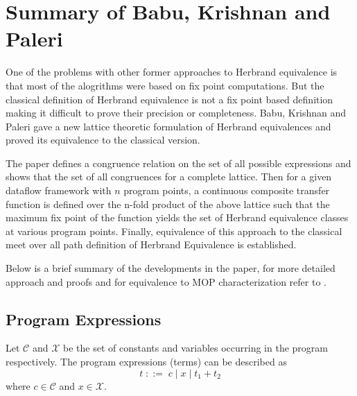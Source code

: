 \chapter{Summary of Babu, Krishnan and Paleri}
\label{chap:chapter5}

One of the problems with other former approaches to Herbrand 
equivalence is that most of the alogrithms were based on fix point 
computations. But the classical definition of Herbrand equivalence is 
not a fix point based definition making it difficult to prove their 
precision or completeness. Babu, Krishnan and Paleri \cite{Babu} gave 
a new lattice theoretic formulation of Herbrand equivalences and 
proved its equivalence to the classical version.

The paper defines a congruence relation on the set of all possible 
expressions and shows that the set of all congruences for a complete 
lattice. Then for a given dataflow framework with $n$ program points, 
a continuous composite transfer function is defined over the n-fold 
product of the above lattice such that the maximum fix point of the 
function yields the set of Herbrand equivalence classes at various 
program points. Finally, equivalence of this approach to the 
classical meet over all path definition of Herbrand Equivalence is 
established.

Below is a brief summary of the developments in the paper, for more 
detailed approach and proofs and for equivalence to MOP  
characterization refer to \cite{Babu}.

\section{Program Expressions}
\label{sec:ProgramExpressions}

Let $\mathcal C$ and $\mathcal X$ be the set of constants and variables 
occurring in the program respectively. The program expressions (terms) 
can be described as 
$$t\; ::=\; c\; |\; x\; |\; t_1 + t_2$$
where $c \in \mathcal C$ and $x \in \mathcal X$.


